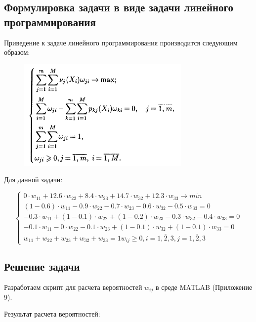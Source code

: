 \subsection{Формулировка задачи в виде задачи линейного программирования}

Приведение к задаче линейного программирования производится следующим образом:

\begin{figure}[h!]
	\centering
	\includegraphics[scale = 0.90]{images/p2_1.png}
	\label{image:p2_1}
\end{figure}

Для данной задачи:

\begin{equation*}
\begin{cases}
\text{$0\cdot w_{11}+12.6\cdot w_{22}+8.4\cdot w_{23}+14.7\cdot w_{32}+12.3\cdot w_{33}\rightarrow min$} \\
\text{$(1-0.6)\cdot w_{11}-0.9\cdot w_{22}-0.7\cdot w_{23}-0.6\cdot w_{32}-0.5\cdot w_{33}=0$} \\
\text{$-0.3\cdot w_{11}+(1-0.1)\cdot w_{22}+(1-0.2)\cdot w_{23}-0.3\cdot w_{32}-0.4\cdot w_{33}=0$} \\
\text{$-0.1\cdot w_{11}-0\cdot w_{22}-0.1\cdot w_{23}+(1-0.1)\cdot w_{32}+(1-0.1)\cdot w_{33}=0$} \\
\text{$w_{11}+w_{22}+w_{23}+w_{32}+w_{33}=1$}
\text{$w_{ij}\geq 0, i=\overline{1,2,3}, j=\overline{1,2,3}$}
\end{cases}
\end{equation*}

\subsection{Решение задачи}

Разработаем скрипт для расчета вероятностей $w_{ij}$ в среде MATLAB (Приложение 9).

Результат расчета вероятностей:

